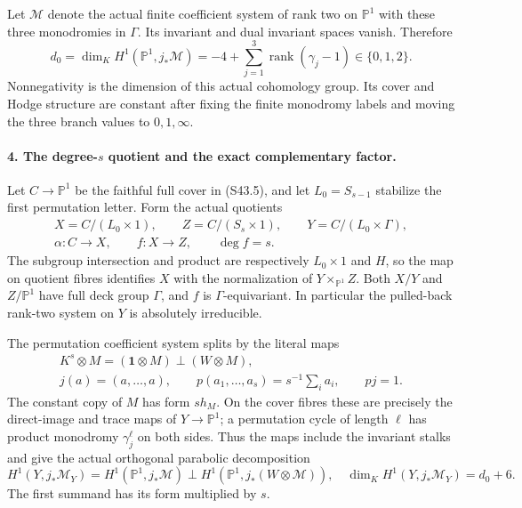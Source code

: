 Let \(\mathcal M\) denote the actual finite coefficient
system of rank two on \(\mathbb P^1\) with these three
monodromies in \(\Gamma\). Its invariant and
dual invariant spaces vanish. Therefore
\[
 d_0=\dim_K H^1(\mathbb P^1,j_*\mathcal M)
       =-4+\sum_{j=1}^3\operatorname{rank}(\gamma_j-1)
                         \in\{0,1,2\}.                   \tag{S43.8}
\]
Nonnegativity is the dimension of this actual cohomology
group. Its cover and Hodge structure are constant after
fixing the finite monodromy labels and moving the three
branch values to \(0,1,\infty\).

\paragraph{4. The degree-\(s\) quotient and the exact complementary factor.}
Let \(C\to\mathbb P^1\) be the faithful full cover in
(S43.5), and let \(L_0=S_{s-1}\) stabilize the first
permutation letter. Form the actual quotients
\[
 \begin{gathered}
 X=C/(L_0\times1),\qquad Z=C/(S_s\times1),\qquad
 Y=C/(L_0\times\Gamma),\\
 \alpha:C\to X,\qquad f:X\to Z,\qquad\deg f=s.
 \end{gathered}                                               \tag{S43.9}
\]
The subgroup intersection and product are respectively
\(L_0\times1\) and \(H\), so the map on quotient
fibres identifies \(X\) with the normalization of
\(Y\times_{\mathbb P^1}Z\). Both \(X/Y\) and
\(Z/\mathbb P^1\) have full deck group \(\Gamma\),
and \(f\) is \(\Gamma\)-equivariant. In particular
the pulled-back rank-two system on \(Y\) is absolutely
irreducible.

The permutation coefficient system splits by the literal maps
\[
 \begin{gathered}
 K^s\otimes M=(\boldsymbol1\otimes M)\perp(W\otimes M),\\
 j(a)=(a,\ldots,a),\qquad
 p(a_1,\ldots,a_s)=s^{-1}\sum_i a_i,\qquad pj=1.
 \end{gathered}                                               \tag{S43.10}
\]
The constant copy of \(M\) has form \(s h_M\).
On the cover fibres these are precisely the direct-image and trace
maps of \(Y\to\mathbb P^1\); a permutation cycle of
length \(\ell\) has product monodromy \(\gamma_j^\ell\)
on both sides. Thus the maps include the invariant stalks
and give the actual orthogonal parabolic decomposition
\[
 H^1(Y,j_*\mathcal M_Y)
     =H^1(\mathbb P^1,j_*\mathcal M)\perp
        H^1(\mathbb P^1,j_*(W\otimes\mathcal M)),
 \quad\dim_K H^1(Y,j_*\mathcal M_Y)=d_0+6.                \tag{S43.11}
\]
The first summand has its form multiplied by \(s\).


